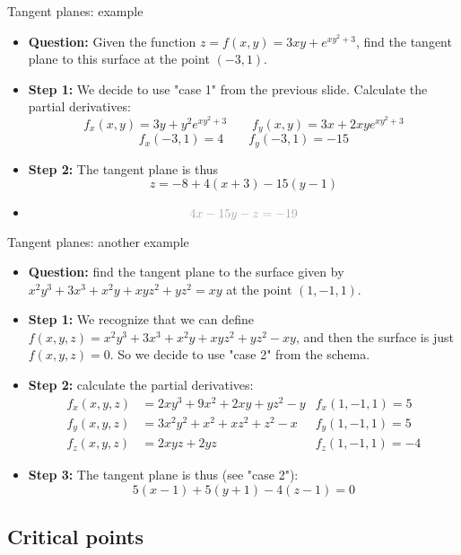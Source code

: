 \begin{frame}{Tangent planes: example}
    \begin{itemize}
        \item
            \textbf{Question:} Given the function $z=f(x,y)=3xy+e^{xy^2+3}$, find the tangent plane to this surface at the point $(-3,1)$.
        \item\pause \textbf{Step 1:} We decide to use "case 1" from the previous slide. Calculate the partial derivatives:
            \[f_x(x,y)=3y+y^2e^{xy^2+3}  \qquad  f_y(x,y)=3x+2xye^{xy^2+3}\]
            \[f_x(-3,1)=4 \qquad f_y(-3,1)=-15\]
        \item\pause \textbf{Step 2:}
            The tangent plane is thus
            \[\boxed{z=-8+4(x+3)-15(y-1)}\]
        \item\pause {}
            \[{\gray{4x-15y-z=-19}}\]
    \end{itemize}
\end{frame}

\begin{frame}{Tangent planes: another example}
    \begin{itemize}
        \item
            \textbf{Question:} find the tangent plane to the surface given by $x^2y^3+3x^3+x^2y+xyz^2+yz^2=xy$ at the point $(1,-1,1)$.
        \item\pause \textbf{Step 1:}  We recognize that we can define $f(x,y,z)=x^2y^3+3x^3+x^2y+xyz^2+yz^2-xy$, and then the surface is just $f(x,y,z)=0$. So we decide to use "case 2" from the schema.
        \item\pause \textbf{Step 2:} calculate the partial derivatives:
            \begin{align*}
                f_x(x,y,z)&=2xy^3+9x^2+2xy+yz^2-y & f_x(1,-1,1)=5\\
                f_y(x,y,z)&=3x^2y^2+x^2+xz^2+z^2-x & f_y(1,-1,1)=5\\
                f_z(x,y,z)&=2xyz+2yz & f_z(1,-1,1)=-4
            \end{align*}
        \item\pause \textbf{Step 3:} The tangent plane is thus (see "case 2"):
            \[\boxed{5(x-1)+5(y+1)-4(z-1)=0}\]

    \end{itemize}
\end{frame}

\subsection{Critical points}


